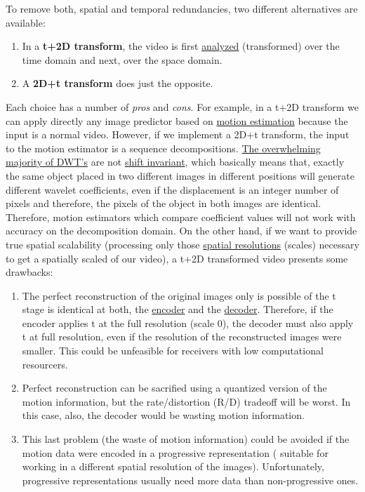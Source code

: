 To remove both, spatial and temporal redundancies, two different
alternatives are available:
\begin{enumerate}
\item In a \textbf{t+2D transform}, the video is first
  \href{https://en.wikipedia.org/wiki/Digital_filter\#Analysis_techniques}{analyzed}
  (transformed) over the time domain and next, over the space domain.
\item A \textbf{2D+t transform} does just the opposite.
\end{enumerate}
Each choice has a number of \emph{pros} and \emph{cons}. For example,
in a t+2D transform we can apply directly any image predictor based on
\href{https://en.wikipedia.org/wiki/Motion_estimation}{motion
  estimation} because the input is a normal video. However, if we
implement a 2D+t transform, the input to the motion estimator is a
sequence decompositions.
\href{http://www.polyvalens.com/blog/wavelets/theory}{The overwhelming
  majority of DWT's} are not
\href{http://www.polyvalens.com/blog/wavelets/theory}{shift
  invariant}, which basically means that, exactly the same object
placed in two different images in different positions will generate
different wavelet coefficients, even if the displacement is an integer
number of pixels and therefore, the pixels of the object in both
images are identical.  Therefore, motion estimators which compare
coefficient values will not work with accuracy on the decomposition
domain. On the other hand, if we want to provide true spatial
scalability (processing only those
\href{https://www.tutorialspoint.com/dip/spatial_resolution.htm}{spatial
  resolutions} (scales) necessary to get a spatially scaled of our
video), a t+2D transformed video presents some drawbacks:

\begin{enumerate}
\item The perfect reconstruction of the original images only is
  possible of the t stage is identical at both, the
  \href{https://en.wikipedia.org/wiki/Encoder}{encoder} and the
  \href{https://en.wikipedia.org/wiki/Decoder}{decoder}. Therefore, if
  the encoder applies t at the full resolution (scale 0), the decoder
  must also apply t at full resolution, even if the resolution of the
  reconstructed images were smaller. This could be unfeasible for
  receivers with low computational resourcers.
\item Perfect reconstruction can be sacrified using a quantized
  version of the motion information, but the rate/distortion (R/D)
  tradeoff will be worst. In this case, also, the decoder would be
  wasting motion information.
\item This last problem (the waste of motion information) could be
  avoided if the motion data were encoded in a progressive
  representation ( suitable for working in a different spatial
  resolution of the images). Unfortunately, progressive
  representations usually need more data than non-progressive ones.
\end{enumerate}

